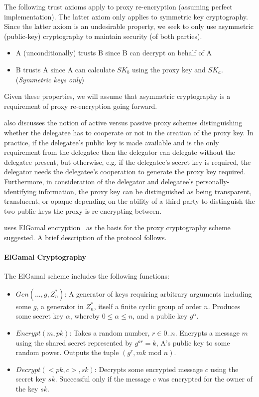 The following trust axioms apply to proxy re-encryption (assuming perfect implementation). The latter axiom only applies to symmetric key cryptography. Since the latter axiom is an undesirable property, we seek to only use asymmetric (public-key) cryptography to maintain security (of both parties).

\begin{itemize}
  \item A (unconditionally) trusts B since B can decrypt on behalf of A
  \item B trusts A since A can calculate $SK_b$ using the proxy key and $SK_a$. (\textit{Symmetric keys only})
\end{itemize}

Given these properties, we will assume that asymmetric cryptography is a requirement of proxy re-encryption going forward.

\cite{bbs:1998:book} also discusses the notion of active versus passive proxy schemes distinguishing whether the delegatee has to cooperate or not in the creation of the proxy key. In practice, if the delegatee's public key is made available and is the only requirement from the delegatee then the delegator can delegate without the delegatee present, but otherwise, e.g. if the delegatee's secret key is required, the delegator needs the delegatee's cooperation to generate the proxy key required. Furthermore, in consideration of the delegator and delegatee's personally-identifying information, the proxy key can be distinguished as being transparent, translucent, or opaque depending on the ability of a third party to distinguish the two public keys the proxy is re-encrypting between.

\cite{bbs:1998:book} uses ElGamal encryption~\cite{elgamal:1985:article} as the basis for the proxy cryptography scheme suggested. A brief description of the protocol follows.

\paragraph{ElGamal Cryptography}

The ElGamal scheme includes the following functions:

\begin{itemize}
  \item $Gen(..., g, Z_n^*)$: A generator of keys requiring arbitrary arguments including some $g$, a generator in $Z_n^*$, itself a finite cyclic group of order $n$. Produces some secret key $\alpha$, whereby $0 \le \alpha \le n$, and a public key $g^\alpha$.
  \item $Encrypt(m, pk)$: Takes a random number, $r \in {0..n}$. Encrypts a message $m$ using the shared secret represented by $g^{ar} = k$, A's public key to some random power. Outputs the tuple $(g^r, mk \text{ mod } n)$.
  \item $Decrypt(<pk, c>, sk)$: Decrypts some encrypted message $c$ using the secret key $sk$. Successful only if the message $c$ was encrypted for the owner of the key $sk$.
\end{itemize}

